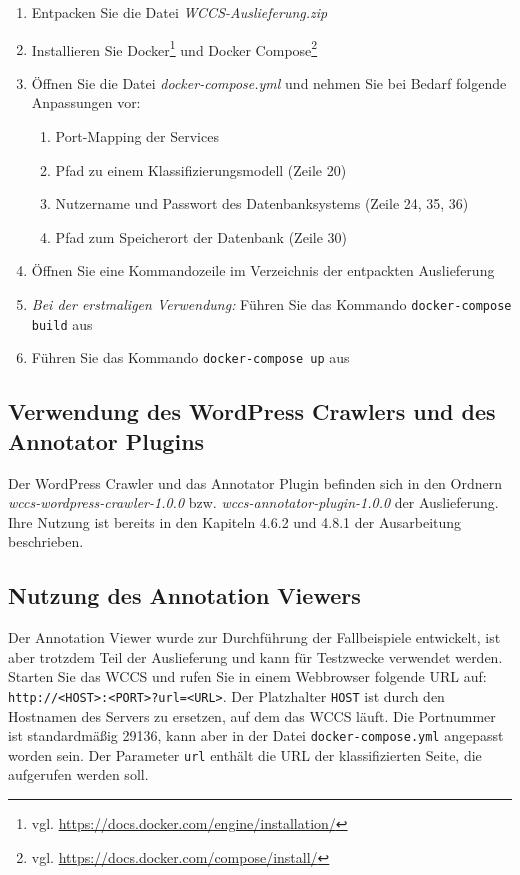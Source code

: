 \documentclass[parskip=half]{scrartcl}
\begin{document}
        \begin{enumerate}
            \item   Entpacken Sie die Datei \textit{WCCS-Auslieferung.zip}
            \item   Installieren Sie Docker\footnote{vgl. \url{https://docs.docker.com/engine/installation/}}
                    und Docker Compose\footnote{vgl. \url{https://docs.docker.com/compose/install/}}
            \item   Öffnen Sie die Datei \textit{docker-compose.yml} und nehmen Sie bei Bedarf folgende Anpassungen vor:
                    \begin{enumerate}
                        \item Port-Mapping der Services
                        \item Pfad zu einem Klassifizierungsmodell (Zeile 20)
                        \item Nutzername und Passwort des Datenbanksystems (Zeile 24, 35, 36)
                        \item Pfad zum Speicherort der Datenbank (Zeile 30)
                    \end{enumerate}
            \item   Öffnen Sie eine Kommandozeile im Verzeichnis der entpackten Auslieferung
            \item   \textit{Bei der erstmaligen Verwendung: } Führen Sie das Kommando \texttt{docker-compose build} aus
            \item   Führen Sie das Kommando \texttt{docker-compose up} aus
        \end{enumerate}

    \subsection*{Verwendung des WordPress Crawlers und des Annotator Plugins}
        Der WordPress Crawler und das Annotator Plugin befinden sich in den
        Ordnern \textit{wccs-wordpress-crawler-1.0.0}
        bzw. \textit{wccs-annotator-plugin-1.0.0} der Auslieferung.
        Ihre Nutzung ist bereits in den Kapiteln 4.6.2 und 4.8.1
        der Ausarbeitung beschrieben.

    \subsection*{Nutzung des Annotation Viewers}
        Der Annotation Viewer wurde zur Durchführung der Fallbeispiele entwickelt,
        ist aber trotzdem Teil der Auslieferung und kann für Testzwecke verwendet werden.
        Starten Sie das WCCS und rufen Sie in einem Webbrowser folgende URL auf:
        \texttt{http://<HOST>:<PORT>?url=<URL>}.
        Der Platzhalter \texttt{HOST} ist durch den Hostnamen des Servers zu ersetzen,
        auf dem das WCCS läuft. Die Portnummer ist standardmäßig 29136, kann aber in der
        Datei \texttt{docker-compose.yml} angepasst worden sein.
        Der Parameter \texttt{url} enthält die URL der klassifizierten Seite,
        die aufgerufen werden soll.
\end{document}
